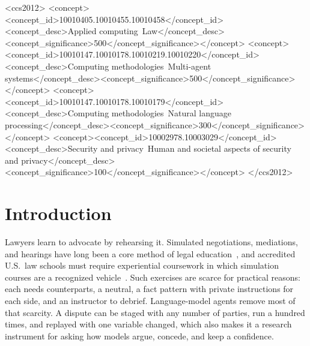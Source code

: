 \documentclass[acmsmall,screen,review]{acmart}
\begin{document}
\begin{CCSXML}
<ccs2012>
<concept><concept_id>10010405.10010455.10010458</concept_id><concept_desc>Applied computing~Law</concept_desc><concept_significance>500</concept_significance></concept>
<concept><concept_id>10010147.10010178.10010219.10010220</concept_id><concept_desc>Computing methodologies~Multi-agent systems</concept_desc><concept_significance>500</concept_significance></concept>
<concept><concept_id>10010147.10010178.10010179</concept_id><concept_desc>Computing methodologies~Natural language processing</concept_desc><concept_significance>300</concept_significance></concept>
<concept><concept_id>10002978.10003029</concept_id><concept_desc>Security and privacy~Human and societal aspects of security and privacy</concept_desc><concept_significance>100</concept_significance></concept>
</ccs2012>
\end{CCSXML}


\maketitle

\section{Introduction}

Lawyers learn to advocate by rehearsing it. Simulated negotiations, mediations, and hearings have long been a core method of legal education~\cite{sullivan2007educating}, and accredited U.S.\ law schools must require experiential coursework in which simulation courses are a recognized vehicle~\cite{aba2025standards}. Such exercises are scarce for practical reasons: each needs counterparts, a neutral, a fact pattern with private instructions for each side, and an instructor to debrief. Language-model agents remove most of that scarcity. A dispute can be staged with any number of parties, run a hundred times, and replayed with one variable changed, which also makes it a research instrument for asking how models argue, concede, and keep a confidence.
\end{document}
